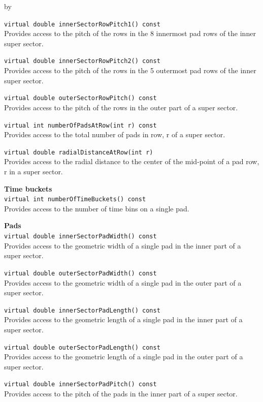 \documentclass[twoside]{article}
\newcommand{\entrylabel}[1]{\mbox{\textbf{{#1}}}\hfil}%
\newenvironment{entry}
{\begin{list}{}%
    {\renewcommand{\makelabel}{\entrylabel}%
     \setlength{\labelwidth}{90pt}%
     \setlength{\leftmargin}{\labelwidth}
     \advance\leftmargin by \labelsep%
      }%
    }%
  {\end{list}}
\newcommand{\Entrylabel}[1]%
{\raisebox{0pt}[1ex][0pt]{\makebox[\labelwidth][l]%
    {\parbox[t]{\labelwidth}{\hspace{0pt}\textbf{{#1}}}}}}
\newenvironment{Entry}%
{\renewcommand{\entrylabel}{\Entrylabel}\begin{entry}}%
  {\end{entry}}
\begin{document}
\begin{Entry}
  \verb+virtual double innerSectorRowPitch1() const+\\
  Provides access to the pitch of the rows in the 8 innermost pad rows
  of the inner super sector.

  \verb+virtual double innerSectorRowPitch2() const+\\
  Provides access to the pitch of the rows in the 5 outermost pad rows
  of the inner super sector.

  \verb+virtual double outerSectorRowPitch() const+\\
  Provides access to the pitch of the rows in the outer part of a super sector.
    
  \verb+virtual int numberOfPadsAtRow(int r) const +\\
  Provides access to the total number of pads in row, r of a super sector.

  \verb+virtual double radialDistanceAtRow(int r)+\\
  Provides access to the radial distance to the center of the mid-point
  of a pad row, r in a super sector.

  {\bf Time buckets \\}
  \verb+virtual int numberOfTimeBuckets() const+\\
  Provides access to the number of time bins on a single pad.
    
  {\bf Pads \\}
  \verb+virtual double innerSectorPadWidth() const+\\
  Provides access to the geometric width of a single pad in the inner part
  of a super sector.

  \verb+virtual double outerSectorPadWidth() const+\\
  Provides access to the geometric width of a single pad in the outer part
  of a super sector.

  \verb+virtual double innerSectorPadLength() const+\\
  Provides access to the geometric length of a single pad in the inner
  part of a super sector.

  \verb+virtual double outerSectorPadLength() const+\\
  Provides access to the geometric length of a single pad in the outer
  part of a super sector.

  \verb+virtual double innerSectorPadPitch() const+\\
  Provides access to the pitch of the pads in the inner part of a
  super sector.


\end{Entry}
\end{document}
